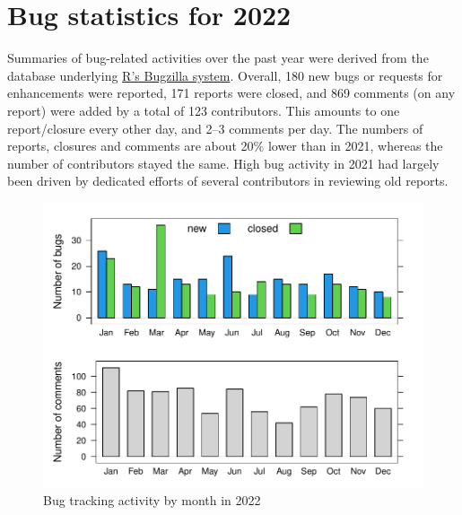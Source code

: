 \hypertarget{bug-statistics-for-2022}{%
\section{Bug statistics for 2022}\label{bug-statistics-for-2022}}

Summaries of bug-related activities over the past year were derived from the
database underlying \href{https://bugs.R-project.org/}{R's Bugzilla system}.
Overall, 180 new bugs or requests for enhancements were reported,
171 reports were closed, and 869 comments (on any report) were added
by a total of 123 contributors.
This amounts to one report/closure every other day,
and 2--3 comments per day.
The numbers of reports, closures and comments are about 20\% lower than in
2021,
whereas the number of contributors stayed the same.
High bug activity in 2021 had largely been driven by dedicated efforts of
several contributors in reviewing old reports.

\begin{figure}

{\centering \includegraphics[width=1\linewidth]{bzstats_mon} 

}

\caption{Bug tracking activity by month in 2022}\label{fig:bzstatsmon}
\end{figure}

